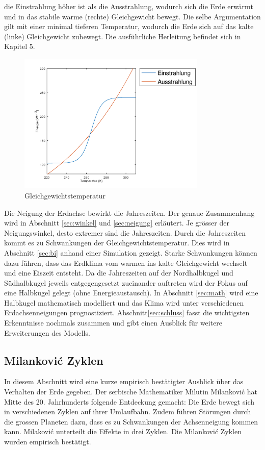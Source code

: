 \begin{refsection}
die Einstrahlung höher ist als die Ausstrahlung, wodurch sich die
Erde erwärmt und in das stabile warme (rechte) Gleichgewicht bewegt.
Die selbe Argumentation gilt mit einer minimal tieferen Temperatur,
wodurch die Erde sich auf das kalte (linke) Gleichgewicht zubewegt.
Die ausführliche Herleitung befindet sich in Kapitel 5.
%
\begin{figure}
	\centering
	\includegraphics[width= 0.8\textwidth]{neigung/Strahlung_1.png}
	\caption[Gleichgewichtstemperatur]{Gleichgewichtstemperatur}
	\label{fig:abb1}
\end{figure}

Die Neigung der Erdachse bewirkt die Jahreszeiten. Der genaue
%
Zusammenhang wird in Abschnitt \ref{sec:winkel} und \ref{sec:neigung}
erläutert. Je grösser der Neigungswinkel, desto extremer sind die
Jahreszeiten. Durch die Jahreszeiten kommt es zu Schwankungen der
Gleichgewichtstemperatur. Dies wird in Abschnitt \ref{sec:bi} anhand
einer Simulation gezeigt. Starke Schwankungen können dazu führen,
dass das Erdklima vom warmen ins kalte Gleichgewicht wechselt und
eine Eiszeit entsteht. Da die Jahreszeiten auf der Nordhalbkugel
und Südhalbkugel jeweils entgegengesetzt zueinander auftreten wird
der Fokus auf eine Halbkugel gelegt (ohne Energieaustausch). In
Abschnitt \ref{sec:math} wird eine Halbkugel mathematisch modelliert
und das Klima wird unter verschiedenen Erdachsenneigungen prognostiziert.
Abschnitt\ref{sec:schluss} fasst die wichtigsten Erkenntnisse
nochmals zusammen und gibt einen Ausblick für weitere Erweiterungen
des Modells.

\subsection{Milankovi\'c Zyklen}\label{sec:mil}
In diesem Abschnitt wird eine kurze empirisch bestätigter Ausblick
über das Verhalten der Erde gegeben. Der serbische Mathematiker
Milutin Milankovi\'c hat Mitte des 20. Jahrhunderts folgende
Entdeckung gemacht: Die Erde bewegt sich in verschiedenen Zyklen
auf ihrer Umlaufbahn.
Zudem führen Störungen durch die grossen Planeten dazu, dass es zu
Schwankungen der Achsenneigung kommen kann. Milakovi\'c unterteilt
die Effekte in drei Zyklen. Die Milankovi\'c Zyklen wurden empirisch
bestätigt.


\end{refsection}

